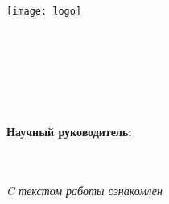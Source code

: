 

\thispagestyle{titlepagestyle}
\begin{SingleSpace}
\begin{center}
\texttt{[image: logo]}\\
{\small
\MakeUppercase{\Univer}\\
\MakeUppercase{\Faculty}\\
\MakeUppercase{\Department}\\[4\baselineskip]
}
\Author\\
\textbf{
  \Title\\[2\baselineskip]
}
\MakeUppercase{\WorkType}\\[3\baselineskip]
\end{center}

\vspace*{2\baselineskip}

\noindent
\begin{minipage}{0.4\textwidth}
\phantom{MMMM}
\end{minipage}
\begin{minipage}{0.58\textwidth}
        \SingleSpacing
        \textbf{Научный руководитель:}\\
        \ifthenelse{\equal{\AcademicDegree}{}}{}{\AcademicDegree,\ }\Position\\
        \SciAdvisor\\[\baselineskip]
    \begin{flushright}
          {\small\textit{C текстом работы ознакомлен}\\[2\baselineskip]\underline{\phantom{МММММММММММMM}} \SciAdvisorShort}
    \end{flushright}
\end{minipage}

\end{SingleSpace}
